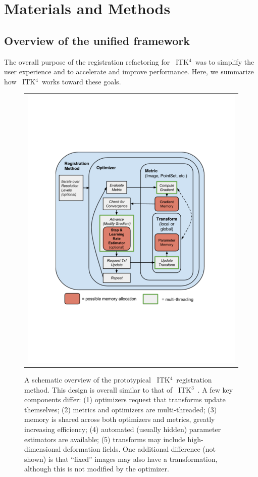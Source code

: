 \documentclass{frontiersSCNS}
\newcommand{\tk}{~ITK$^{\text{4}}$~}
\newcommand{\tkt}{~ITK$^{\text{3}}$~}
\begin{document}
\section{Materials and Methods}
\subsection{Overview of the unified framework}
The overall purpose of the registration refactoring for \tk was to
simplify the user experience and to accelerate and improve
performance. Here, we summarize how \tk works toward these goals.
\begin{figure}[t]
\begin{center}
\begin{tabular}{c}
\includegraphics[width=5in]{figs/software_design.pdf}
\end{tabular}
\caption{\baselineskip 12pt \small A schematic overview of the
  prototypical \tk registration method.  This design is overall similar to
  that of \tkt.  A few key components differ:  (1) optimizers request that
  transforms update themselves; (2) metrics and optimizers are
  multi-threaded; (3) memory is shared across both optimizers and metrics,
greatly increasing efficiency; (4) automated (usually hidden) parameter
estimators are available; (5) transforms may include high-dimensional
deformation fields.  One additional difference (not shown) is that ``fixed''
images may also have a transformation, although this is not modified
by the optimizer.}
\label{fig:softw}
\end{center}
\end{figure}
\end{document}
